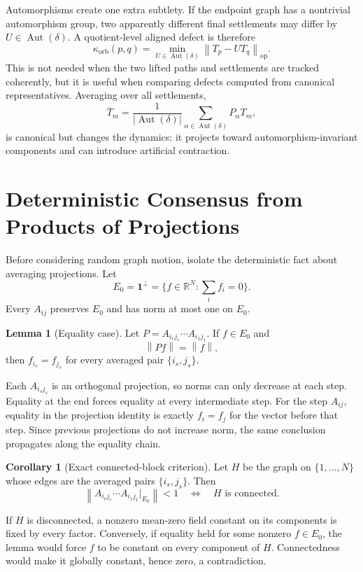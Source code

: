 \documentclass[11pt]{article}
\makeatletter
\newcommand{\R}{\mathbb R}
\newcommand{\one}{\mathbf 1}
\newcommand{\norm}[1]{\left\|#1\right\|}
\newcommand{\Aut}{\operatorname{Aut}}
\theoremstyle{definition}
\newtheorem{lemma}[theorem]{Lemma}
\newtheorem{corollary}[theorem]{Corollary}
\renewenvironment{proof}[1][\proofname]{\par
  \pushQED{\qed}%
  \normalfont \topsep6\p@\@plus6\p@\relax
  \trivlist
  \item[\hskip\labelsep\bfseries #1\@addpunct{.}]\ignorespaces
}{%
  \popQED\endtrivlist\@endpefalse
}
\makeatother
\begin{document}
Automorphisms create one extra subtlety.  If the endpoint graph has a nontrivial
automorphism group, two apparently different final settlements may differ by
$U\in\Aut(\delta)$.  A quotient-level aligned defect is therefore
\[
    \kappa_{\mathrm{orb}}(p,q)
    =
    \min_{U\in\Aut(\delta)}
    \norm{T_p-UT_q}_{\mathrm{op}}.
\]
This is not needed when the two lifted paths and settlements are tracked
coherently, but it is useful when comparing defects computed from canonical
representatives.  Averaging over all settlements,
\[
    \overline T_m
    =
    \frac{1}{|\Aut(\delta)|}
    \sum_{\alpha\in\Aut(\delta)}P_\alpha T_m,
\]
is canonical but changes the dynamics: it projects toward
automorphism-invariant components and can introduce artificial contraction.

\section{Deterministic Consensus from Products of Projections}

Before considering random graph motion, isolate the deterministic fact about
averaging projections.  Let
\[
    E_0=\one^\perp=\{f\in\R^N:\sum_i f_i=0\}.
\]
Every $A_{ij}$ preserves $E_0$ and has norm at most one on $E_0$.

\begin{lemma}[Equality case]
Let $P=A_{i_rj_r}\cdots A_{i_1j_1}$.  If $f\in E_0$ and
\[
    \norm{Pf}=\norm{f},
\]
then $f_{i_s}=f_{j_s}$ for every averaged pair $\{i_s,j_s\}$.
\end{lemma}

\begin{proof}
Each $A_{i_sj_s}$ is an orthogonal projection, so norms can only decrease at
each step.  Equality at the end forces equality at every intermediate step.
For the step $A_{ij}$, equality in the projection identity is exactly
$f_i=f_j$ for the vector before that step.  Since previous projections do not
increase norm, the same conclusion propagates along the equality chain.
\end{proof}

\begin{corollary}[Exact connected-block criterion]
Let $H$ be the graph on $\{1,\ldots,N\}$ whose edges are the averaged pairs
$\{i_s,j_s\}$.  Then
\[
    \norm{A_{i_rj_r}\cdots A_{i_1j_1}|_{E_0}}<1
    \quad\Longleftrightarrow\quad H\text{ is connected}.
\]
\end{corollary}

\begin{proof}
If $H$ is disconnected, a nonzero mean-zero field constant on its components
is fixed by every factor.  Conversely, if equality held for some nonzero
$f\in E_0$, the lemma would force $f$ to be constant on every component of
$H$.  Connectedness would make it globally constant, hence zero, a
contradiction.
\end{proof}
\end{document}
